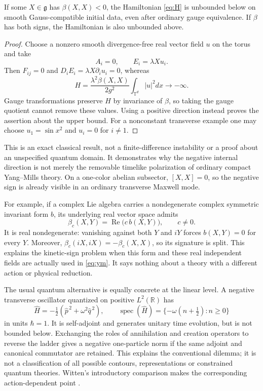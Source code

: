 \begin{proposition}
\label{prop:negative}
If some $X\in\mathfrak g$ has $\beta(X,X)<0$, the Hamiltonian
\eqref{eq:H} is unbounded below on smooth Gauss-compatible initial data,
even after ordinary gauge equivalence. If $\beta$ has both signs, the
Hamiltonian is also unbounded above.
\end{proposition}
\begin{proof}
Choose a nonzero smooth divergence-free real vector field $u$ on the
torus and take
\[
 A_i=0,\qquad E_i=\lambda X u_i.
\]
Then $F_{ij}=0$ and $D_iE_i=\lambda X\partial_i u_i=0$, whereas
\[
 H=\frac{\lambda^2\beta(X,X)}{2g^2}
       \int_{\mathbb T^d}|u|^2dx\longrightarrow-\infty.
\]
Gauge transformations preserve $H$ by invariance of $\beta$, so taking
the gauge quotient cannot remove these values. Using a positive direction
instead proves the assertion about the upper bound. For a nonconstant
transverse example one may choose $u_1=\sin x^2$ and $u_i=0$ for $i\ne1$.
\end{proof}

This is an exact classical result, not a finite-difference instability
or a proof about an unspecified quantum domain. It demonstrates why the
negative internal direction is not merely the removable timelike
polarization of ordinary compact Yang--Mills theory. On a one-color
abelian subsector, $[X,X]=0$, so the negative sign is already visible in
an ordinary transverse Maxwell mode.

For example, if a complex Lie algebra carries a nondegenerate complex
symmetric invariant form $b$, its underlying real vector space admits
\[
 \beta_c(X,Y)=\operatorname{Re}\bigl(c\,b(X,Y)\bigr),\qquad c\ne0.
\]
It is real nondegenerate: vanishing against both $Y$ and $iY$ forces
$b(X,Y)=0$ for every $Y$. Moreover,
$\beta_c(iX,iX)=-\beta_c(X,X)$, so its signature is split. This explains
the kinetic-sign problem when this form and these real independent fields
are actually used in \eqref{eq:ym}. It says nothing about a theory with
a different action or physical reduction.

The usual quantum alternative is equally concrete at the linear level.
A negative transverse oscillator quantized on positive $L^2(\mathbb R)$
has
\[
 \widehat H=-\tfrac12(\widehat p^{\,2}+\omega^2\widehat q^{\,2}),
 \qquad \operatorname{spec}(\widehat H)
 =\{-\omega(n+\tfrac12):n\geq0\}
\]
in units $\hbar=1$. It is self-adjoint and generates unitary time
evolution, but is not bounded below. Exchanging the roles of annihilation
and creation operators to reverse the ladder gives a negative one-particle
norm if the same adjoint and canonical commutator are retained. This
explains the conventional dilemma; it is not a classification of all
possible contours, representations or constrained quantum theories.
Witten's introductory comparison makes the corresponding action-dependent
point \cite[report pp.~2--3]{WittenReport}.

